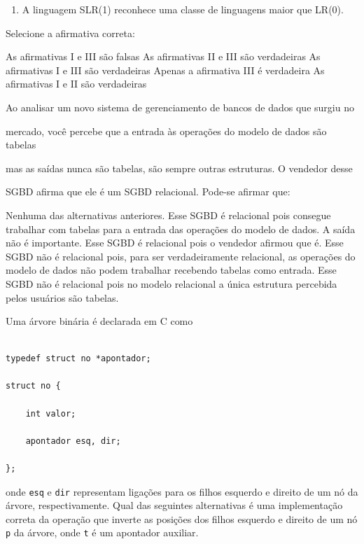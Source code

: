 \documentclass[12pt, addpoints]{exam}
\begin{document}
\begin{questions}
\begin{enumerate}[label=\Roman*.]
    \item A linguagem SLR(1) reconhece uma classe de linguagens maior que LR(0).

\end{enumerate}

Selecione a afirmativa correta:
\begin{choices}
\choice As afirmativas I e III são falsas
\choice As afirmativas II e III são verdadeiras
\choice As afirmativas I e III são verdadeiras
\choice Apenas a afirmativa III é verdadeira
\choice As afirmativas I e II são verdadeiras
\end{choices}

\question

Ao analisar um novo sistema de gerenciamento de bancos de dados que surgiu no

mercado, você percebe que a entrada às operações do modelo de dados são tabelas

mas as saídas nunca são tabelas, são sempre outras estruturas. O vendedor desse

SGBD afirma que ele é um SGBD relacional. Pode-se afirmar que:


\begin{choices}
\choice Nenhuma das alternativas anteriores.
\choice Esse SGBD é relacional pois consegue trabalhar com tabelas para a entrada das operações do modelo de dados. A saída não é importante.
\choice Esse SGBD é relacional pois o vendedor afirmou que é.
\choice Esse SGBD não é relacional pois, para ser verdadeiramente relacional, as operações do modelo de dados não podem trabalhar recebendo tabelas como entrada.
\choice Esse SGBD não é relacional pois no modelo relacional a única estrutura percebida pelos usuários são tabelas.
\end{choices}

\question

Uma árvore binária é declarada em C como



\begin{verbatim}

typedef struct no *apontador;

struct no {

    int valor;

    apontador esq, dir;

};

\end{verbatim}



onde \texttt{esq} e \texttt{dir} representam ligações para os filhos esquerdo e direito de um nó da árvore, respectivamente. Qual das seguintes alternativas é uma implementação correta da operação que inverte as posições dos filhos esquerdo e direito de um nó \texttt{p} da árvore, onde \texttt{t} é um apontador auxiliar.



\end{questions}
\end{document}
